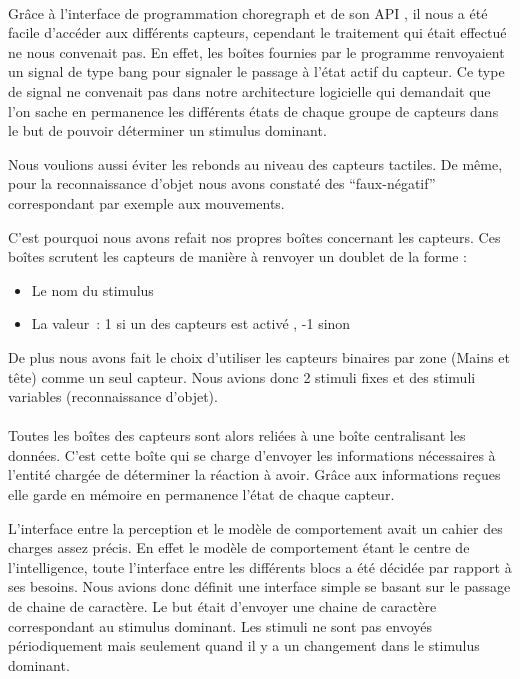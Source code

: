 
\paragraph{}
Grâce à l'interface de programmation choregraph et de son API , il nous a été
facile d'accéder aux différents capteurs, cependant le traitement qui était
effectué ne nous convenait pas. En effet, les boîtes fournies par le programme
renvoyaient un signal de type bang pour signaler le passage à l'état actif du
capteur. Ce type de signal ne convenait pas dans notre architecture logicielle
qui demandait que l'on sache en permanence les différents états de chaque
groupe de capteurs dans le but de pouvoir déterminer un stimulus dominant.

Nous voulions aussi éviter les rebonds au niveau des capteurs tactiles. 
De même, pour la reconnaissance d'objet nous avons constaté des ``faux-négatif''
correspondant par exemple aux mouvements. 
  
C'est pourquoi nous avons refait nos propres boîtes concernant les capteurs.
Ces boîtes scrutent les capteurs de manière à renvoyer un doublet de la forme :
\begin{itemize}
  \item Le nom du stimulus
  \item La valeur~: 1 si un des capteurs est activé , -1 sinon
\end{itemize}
 
De plus nous avons fait le choix d'utiliser les capteurs binaires par zone 
(Mains et tête) comme un seul capteur. Nous avions donc 2 stimuli fixes et
des stimuli variables (reconnaissance d'objet). 

\paragraph{}
Toutes les boîtes des capteurs sont alors reliées à une boîte centralisant les 
données. C'est cette boîte qui se charge d'envoyer les informations nécessaires 
à l'entité chargée de déterminer la réaction à avoir.
Grâce aux informations reçues elle garde en mémoire en permanence l'état de chaque capteur.

L'interface entre la perception et le modèle de comportement avait un cahier des charges assez précis. 
En effet le modèle de comportement étant le centre de l'intelligence, toute l'interface 
entre les différents blocs a été décidée par rapport à ses besoins. Nous avions donc définit
une interface simple se basant sur le passage de chaine de caractère. Le but était 
d'envoyer une chaine de caractère correspondant au stimulus dominant. Les stimuli ne 
sont pas envoyés périodiquement mais seulement quand il y a un changement dans le 
stimulus dominant.


